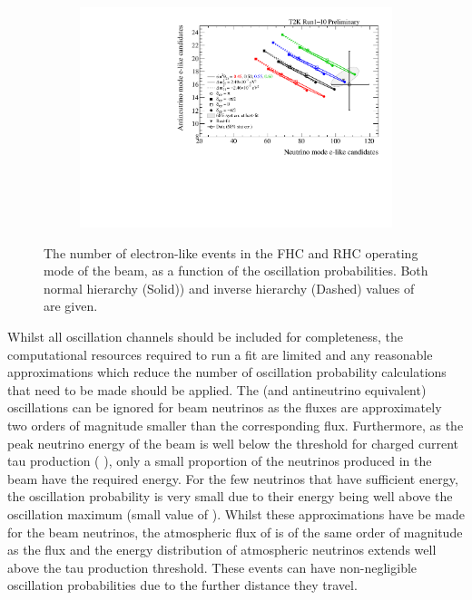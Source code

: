 \begin{figure}[h]
  \begin{subfigure}[t]{0.65\textwidth}
    \includegraphics[width=\textwidth, trim={0mm 0mm 0mm 0mm}, clip,page=1]{Figures/Oscillation/BiProbabilityPlot.pdf}
  \end{subfigure}
  \caption{The number of electron-like events in the FHC and RHC operating mode of the beam, as a function of the oscillation probabilities. Both normal hierarchy (Solid)) and inverse hierarchy (Dashed) values of  are given.}
  \label{fig:Oscillation_SK_BiProbabilityPlot}
\end{figure}

Whilst all oscillation channels should be included for completeness, the computational resources required to run a fit are limited and any reasonable approximations which reduce the number of oscillation probability calculations that need to be made should be applied. The  (and antineutrino equivalent) oscillations can be ignored for beam neutrinos as the  fluxes are approximately two orders of magnitude smaller than the corresponding \quickmath{\nu_{\mu}/\bar{\nu}_{\mu}} flux. Furthermore, as the peak neutrino energy of the beam is well below the threshold for charged current tau production ( \cite{Li_2018}), only a small proportion of the neutrinos produced in the beam have the required energy. For the few neutrinos that have sufficient energy, the oscillation probability is very small due to their energy being well above the oscillation maximum (small value of ). Whilst these approximations have be made for the beam neutrinos, the atmospheric flux of  is of the same order of magnitude as the \quickmath{\nu_{\mu}} flux and the energy distribution of atmospheric neutrinos extends well above the tau production threshold. These events can have non-negligible oscillation probabilities due to the further distance they travel.
